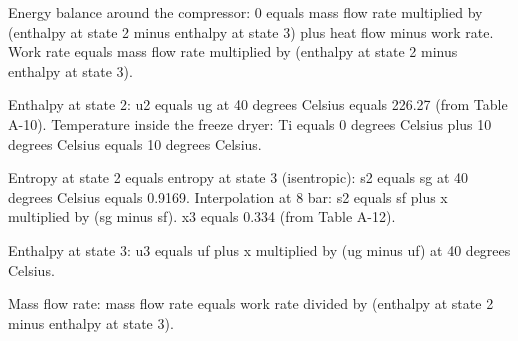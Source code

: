 Energy balance around the compressor:  
0 equals mass flow rate multiplied by (enthalpy at state 2 minus enthalpy at state 3) plus heat flow minus work rate.  
Work rate equals mass flow rate multiplied by (enthalpy at state 2 minus enthalpy at state 3).  

Enthalpy at state 2:  
u2 equals ug at 40 degrees Celsius equals 226.27 (from Table A-10).  
Temperature inside the freeze dryer: Ti equals 0 degrees Celsius plus 10 degrees Celsius equals 10 degrees Celsius.  

Entropy at state 2 equals entropy at state 3 (isentropic):  
s2 equals sg at 40 degrees Celsius equals 0.9169.  
Interpolation at 8 bar:  
s2 equals sf plus x multiplied by (sg minus sf).  
x3 equals 0.334 (from Table A-12).  

Enthalpy at state 3:  
u3 equals uf plus x multiplied by (ug minus uf) at 40 degrees Celsius.  

Mass flow rate:  
mass flow rate equals work rate divided by (enthalpy at state 2 minus enthalpy at state 3).